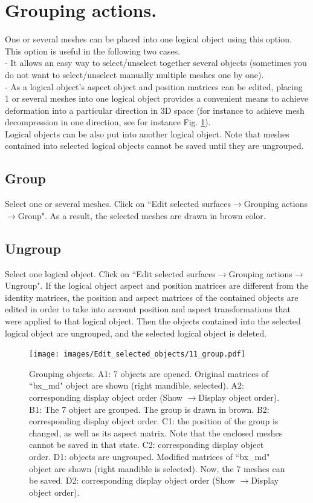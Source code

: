 \section{Grouping actions.}
One or several meshes can be placed into one logical object using this option. This option is useful in the following two cases.\\
- It allows an easy way to select/unselect together several objects (sometimes you do not want
to select/unselect manually multiple meshes one by one).\\
- As a logical object's aspect object and position matrices can be edited, placing 1 or several
meshes into one logical object provides a convenient means to achieve deformation into
a particular direction in 3D space (for instance to achieve mesh decompression in one
direction, see for instance Fig. \ref{grouping}).\\
Logical objects can be also put into another logical object. Note that meshes contained into selected logical objects cannot be saved until they are ungrouped.

\subsection{Group}
Select one or several meshes. Click on ``Edit selected surfaces$\rightarrow$Grouping actions$\rightarrow$Group". As a result, the selected meshes are drawn in brown color.
\subsection{Ungroup}
Select one logical object. Click on ``Edit selected surfaces$\rightarrow$Grouping actions$\rightarrow$Ungroup". If the logical object aspect and position matrices are different from the identity matrices, the position and aspect matrices of the contained objects are edited in order to take into account position and aspect transformations that were applied to that logical object. Then the objects contained into the selected logical object are ungrouped, and the selected logical object is deleted.\\


\begin{figure}
  \centering
  \texttt{[image: images/Edit\_selected\_objects/11\_group.pdf]} 
	\caption{
Grouping objects. A1: 7 objects are opened. Original matrices of ``bx\_md" object are shown (right mandible, selected). A2: corresponding display object order (Show $\rightarrow$Display object order). B1: The 7 object are grouped. The group is drawn in brown. B2: corresponding display object order. C1: the position of the group is changed, as well as its aspect matrix. Note that the enclosed meshes cannot be saved in that state. C2: corresponding display object order. D1: objects are ungrouped. Modified matrices of ``bx\_md" object are shown (right mandible is selected). Now, the 7 meshes can be saved. D2: corresponding display object order (Show $\rightarrow$Display object order).}
\label{grouping}
 
\end{figure}


